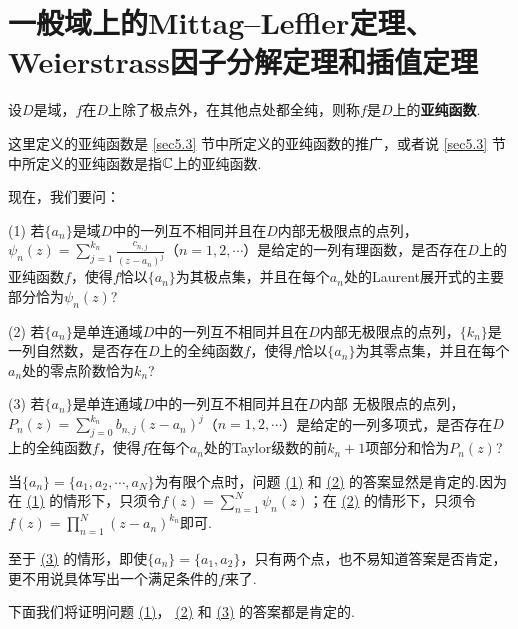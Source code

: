 \section{一般域上的Mittag--Leffler定理、Weierstrass因子分解定理和插值定理\label{sec5.6}}
\begin{definition}\label{def5.6.1}
设$D$是域，$f$在$D$上除了极点外，在其他点处都全纯，则称$f$是$D$上的\textbf{亚纯函数}.
\end{definition}

这里定义的亚纯函数是 \ref{sec5.3} 节中所定义的亚纯函数的推广，或者说 \ref{sec5.3} 节中所定义的亚纯函数是指$\mathbb C$上的亚纯函数.

现在，我们要问：

(1) \hypertarget{5.6.1}{} 若$\{a_n\}$是域$D$中的一列互不相同并且在$D$内部无极限点的点列，$\psi_n(z)=\sum_{j=1}^{k_n}\frac{c_{n,j}}{(z-a_n)^j}$（$n=1,2,\cdots$）是给定的一列有理函数，是否存在$D$上的亚纯函数$f$，使得$f$恰以$\{a_n\}$为其极点集，并且在每个$a_n$处的Laurent展开式的主要部分恰为$\psi_n(z)$?

(2) \hypertarget{5.6.2}{} 若$\{a_n\}$是单连通域$D$中的一列互不相同并且在$D$内部无极限点的点列，$\{k_n\}$是一列自然数，是否存在$D$上的全纯函数$f$，使得$f$恰以$\{a_n\}$为其零点集，并且在每个$a_n$处的零点阶数恰为$k_n$?

(3) \hypertarget{5.6.3}{} 若$\{a_n\}$是单连通域$D$中的一列互不相同并且在$D$内部
无极限点的点列，$P_n(z)=\sum_{j=0}^{k_n}b_{n,j}(z-a_n)^j$（$n=1,2,\cdots$）是给定的一列多项式，是否存在$D$上的全纯函数$f$，使得$f$在每个$a_n$处的Taylor级数的前$k_n+1$项部分和恰为$P_n(z)$?

当$\{a_n\}=\{a_1,a_2,\cdots,a_N\}$为有限个点时，问题 \hyperlink{5.6.1}{(1)} 和 \hyperlink{5.6.2}{(2)} 的答案显然是肯定的.因为在 \hyperlink{5.6.1}{(1)} 的情形下，只须令$f(z)=\sum_{n=1}^N\psi_n(z)$；在 \hyperlink{5.6.2}{(2)}  的情形下，只须令$f(z)=\prod_{n=1}^N(z-a_n)^{k_n}$即可.

至于 \hyperlink{5.6.3}{(3)} 的情形，即使$\{a_n\}=\{a_1,a_2\}$，只有两个点，也不易知道答案是否肯定，更不用说具体写出一个满足条件的$f$来了.

下面我们将证明问题 \hyperlink{5.6.1}{(1)}， \hyperlink{5.6.2}{(2)} 和  \hyperlink{5.6.3}{(3)} 的答案都是肯定的.

